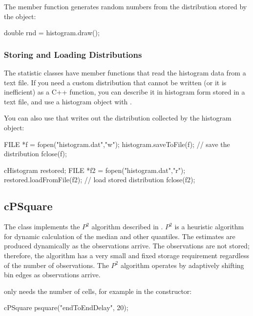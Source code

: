 The  member function generates random
numbers from the distribution stored by the
object:

\begin{cpp}
double rnd = histogram.draw();
\end{cpp}


\subsubsection{Storing and Loading Distributions}
\label{sec:sim-lib:storing-and-loading-distributions}

The statistic classes have  member functions
that read the histogram data from a text file. If you need a custom
distribution that cannot be written (or it
is inefficient) as a C++ function, you can describe it in histogram form
stored in a text file, and use a histogram object with
.

You can also use  that writes out the distribution
collected by the histogram object:

\begin{cpp}
FILE *f = fopen("histogram.dat","w");
histogram.saveToFile(f); // save the distribution
fclose(f);

cHistogram restored;
FILE *f2 = fopen("histogram.dat","r");
restored.loadFromFile(f2); // load stored distribution
fclose(f2);
\end{cpp}


\subsection{cPSquare}
\label{sec:sim-lib:psquare}

The  class implements the $P^{2}$ algorithm
described in \cite{JCh85}. $P^{2}$ is a heuristic algorithm
for dynamic calculation of the median and other quantiles.
The estimates are produced dynamically as the observations arrive.
The observations are not stored; therefore, the algorithm has
a very small and fixed storage requirement regardless of
the number of observations. The $P^{2}$ algorithm operates
by adaptively shifting bin edges as observations arrive.

 only needs the number of cells, for example
in the constructor:

\begin{cpp}
cPSquare psquare("endToEndDelay", 20);
\end{cpp}

